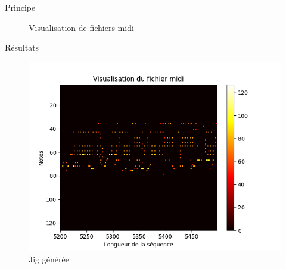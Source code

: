 \documentclass{beamer}
\begin{document}
\begin{frame}{Principe}
\begin{figure}[!tbp]
  \centering
  \hfill
  \caption{Visualisation de fichiers midi}
\end{figure}
\end{frame}

\begin{frame}{Résultats}

\begin{figure}
\begin{center}
\includegraphics[width=0.9\linewidth]{images/jig_generated_38800.png}
\caption{Jig générée}
\end{center}
\end{figure}
\end{frame}
\end{document}
